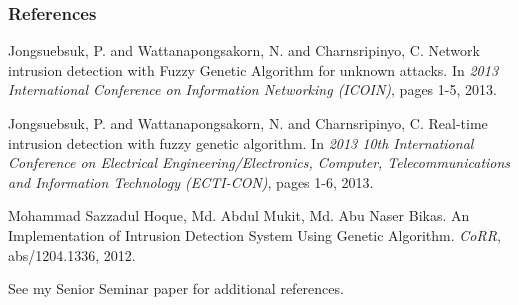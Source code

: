 \documentclass{beamer}
\newcommand{\linespace}{\vskip 0.25cm}
\begin{document}
\begin{frame} 
	\frametitle{References} 
	
	\begin{thebibliography}{lskdjf}
	
	\begin{small}
Jongsuebsuk, P. and Wattanapongsakorn, N. and Charnsripinyo, C.
\newblock Network intrusion detection with Fuzzy Genetic Algorithm for unknown attacks.
\newblock In \emph{2013 International Conference on Information Networking (ICOIN)}, pages 1-5, 2013.
	
	
Jongsuebsuk, P. and Wattanapongsakorn, N. and Charnsripinyo, C.
\newblock Real-time intrusion detection with fuzzy genetic algorithm.
\newblock In \emph{2013 10th International Conference on Electrical Engineering/Electronics, Computer, Telecommunications and Information Technology (ECTI-CON)}, pages 1-6, 2013.
	
	
Mohammad Sazzadul Hoque, Md. Abdul Mukit, Md. Abu Naser Bikas.
\newblock An Implementation of Intrusion Detection System Using Genetic Algorithm.
\newblock \emph{CoRR}, abs/1204.1336, 2012.
	\end{small}
	
  	\end{thebibliography}
  	
  	\linespace
  	
  	\begin{center}
  	\begin{small}
  	See my Senior Seminar paper for additional references.
  	\end{small}
  	\end{center}
	
\end{frame} 
\end{document}
